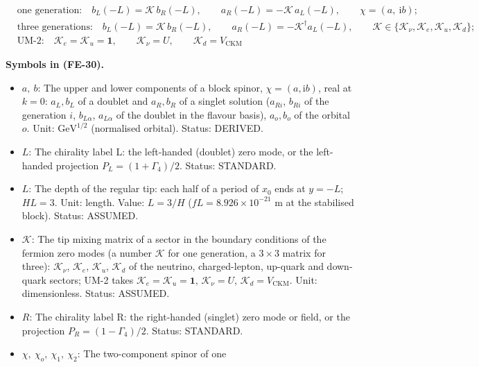 \documentclass[
  10pt,
]{article}
\providecommand{\tightlist}{%
  \setlength{\itemsep}{0pt}\setlength{\parskip}{0pt}}
\begin{document}
\[
\begin{aligned}
&\text{one generation:}\quad b_L(-L) = \mathcal{K}\,b_R(-L),\qquad a_R(-L) =
 -\mathcal{K}\,a_L(-L),\qquad \chi = (a,\ \mathrm{i}b);\\
&\text{three generations:}\quad b_L(-L) = \mathcal{K}\,b_R(-L),\qquad a_R(-L) = -\mathcal{K}^\dagger
 a_L(-L),\qquad
 \mathcal{K} \in \{\mathcal{K}_\nu, \mathcal{K}_e, \mathcal{K}_u, \mathcal{K}_d\};\\
&\text{UM-2:}\quad \mathcal{K}_e = \mathcal{K}_u = \mathbf{1},\qquad \mathcal{K}_\nu = U,\qquad
 \mathcal{K}_d = V_{\mathrm{CKM}}
\end{aligned} \tag{FE-30}
\]

\textbf{Symbols in (FE-30).}

\begin{itemize}
\tightlist
\item
  \(a,\ b\): The upper and lower components of a block spinor,
  \(\chi = (a, \mathrm{i}b)\), real at \(k = 0\): \(a_L, b_L\) of a
  doublet and \(a_R, b_R\) of a singlet solution (\(a_{Ri}\), \(b_{Ri}\)
  of the generation \(i\), \(b_{L\alpha}\), \(a_{L\alpha}\) of the
  doublet in the flavour basis), \(a_o, b_o\) of the orbital \(o\).
  Unit: \(\mathrm{GeV}^{1/2}\) (normalised orbital). Status: DERIVED.
\item
  \(L\): The chirality label L: the left-handed (doublet) zero mode, or
  the left-handed projection \(P_L = (1 + \Gamma_4)/2\). Status:
  STANDARD.
\item
  \(L\): The depth of the regular tip: each half of a period of \(x_0\)
  ends at \(y = -L\); \(HL = 3\). Unit: length. Value: \(L = 3/H\)
  (\(fL = 8.926\times10^{-21}\) m at the stabilised block). Status:
  ASSUMED.
\item
  \(\mathcal{K}\): The tip mixing matrix of a sector in the boundary
  conditions of the fermion zero modes (a number \(\mathcal{K}\) for one
  generation, a \(3 \times 3\) matrix for three): \(\mathcal{K}_\nu\),
  \(\mathcal{K}_e\), \(\mathcal{K}_u\), \(\mathcal{K}_d\) of the
  neutrino, charged-lepton, up-quark and down-quark sectors; UM-2 takes
  \(\mathcal{K}_e = \mathcal{K}_u = \mathbf{1}\),
  \(\mathcal{K}_\nu = U\), \(\mathcal{K}_d = V_{\mathrm{CKM}}\). Unit:
  dimensionless. Status: ASSUMED.
\item
  \(R\): The chirality label R: the right-handed (singlet) zero mode or
  field, or the projection \(P_R = (1 - \Gamma_4)/2\). Status: STANDARD.
\item
  \(\chi,\ \chi_o,\ \chi_1,\ \chi_2\): The two-component spinor of one

\end{itemize}
\end{document}
